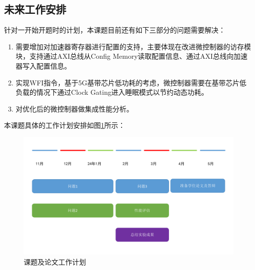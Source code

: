 \documentclass[a4paper, 12pt]{article}
\begin{document}
\subsection{未来工作安排}

针对一开始开题时的计划，本课题目前还有如下三部分的问题需要解决：
\begin{enumerate}
  \item 需要增加对加速器寄存器进行配置的支持，主要体现在改进微控制器的访存模块，支持通过AXI总线从Config Memory读取配置信息、通过AXI总线向加速器写入配置信息。
  \item 实现WFI指令\cite{agarwal2019low}，基于5G基带芯片低功耗的考虑，微控制器需要在基带芯片低负载的情况下通过Clock Gating进入睡眠模式以节约动态功耗\cite{venkatesan2019design}。
  \item 对优化后的微控制器做集成性能分析。
\end{enumerate}

本课题具体的工作计划安排如图\ref{fig:job_plan}所示：
\begin{figure}[htbp]
  \centering
  \includegraphics[width=\linewidth]{./images/job_plan.pdf}
  \caption{课题及论文工作计划}
  \label{fig:job_plan}
\end{figure}
 

\clearpage
\end{document}
